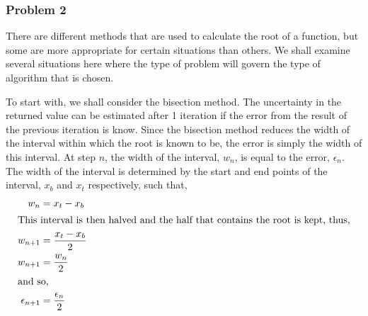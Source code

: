 \documentclass[11pt]{article} %
\newcommand{\inter}[1]{\shortintertext{#1}}
\begin{document}
	\subsubsection{Problem 2}
	There are different methods that are used to calculate the root of a function, but some are more appropriate for certain situations than others. We shall examine several situations here where the type of problem will govern the type of algorithm that is chosen.

	To start with, we shall consider the bisection method. The uncertainty in the returned value can be estimated after 1 iteration if the error from the result of the previous iteration is know. Since the bisection method reduces the width of the interval within which the root is known to be, the error is simply the width of this interval. At step $n$, the width of the interval, $w_n$, is equal to the error, $\epsilon_n$. The width of the interval is determined by the start and end points of the interval, $x_b$ and $x_t$ respectively, such that,
	\begin{align*}
		w_n &= x_t - x_b \\
		\intertext{This interval is then halved and the half that contains the root is kept, thus,}
		w_{n+1} &= \frac{x_t - x_b}{2} \\
		w_{n+1} &= \frac{w_n}{2} \\
		\inter{and so,}
		\epsilon_{n+1} &= \frac{\epsilon_n}{2} \\
	\end{align*}
\end{document}
